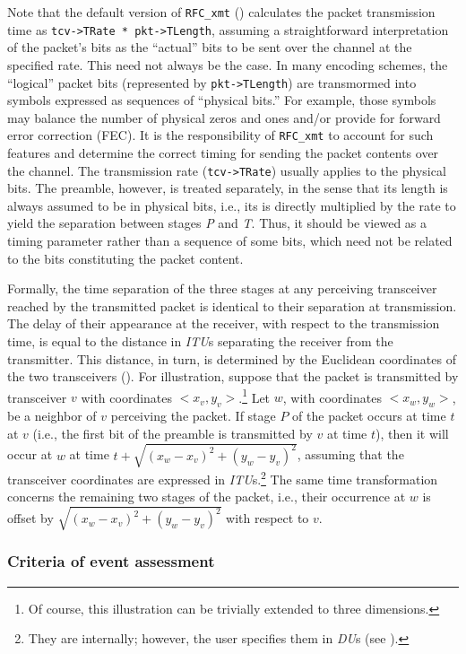 Note that the default version of {\tt RFC\_xmt} ()
calculates the packet transmission time as {\tt tcv->TRate * pkt->TLength},
assuming a straightforward interpretation of the packet's bits as the
``actual'' bits to be sent over the channel at the specified rate.
This need not always be the case.
In many encoding schemes, the ``logical''
packet bits (represented by {\tt pkt->TLength})
are transmormed into symbols expressed as sequences of ``physical bits.''
For example, those symbols may balance the number of physical zeros and ones
and/or provide for forward error correction (FEC).
It is the responsibility of {\tt RFC\_xmt} to account for such features and
determine the correct timing for sending the packet contents over the channel.
The transmission rate ({\tt tcv->TRate}) usually applies to the physical
bits.
The preamble, however, is treated separately, in the sense that its length
is always
assumed to be in physical bits, i.e., its is directly multiplied by the
rate to yield the separation between stages {\em P\/} and {\em T}.
Thus, it should be viewed as a timing parameter rather than a sequence of
some bits, which need not be related to the bits constituting the packet
content.

Formally, the time separation of the three stages at any perceiving
transceiver reached by
the transmitted packet is identical to their separation at transmission.
The delay of their appearance at the receiver, with respect to the transmission
time, is equal to the distance in {\em ITU\/}s separating the
receiver from the transmitter.
This distance, in turn, is determined by the Euclidean coordinates of the
two transceivers ().
For illustration, suppose that the packet is transmitted by transceiver
$v$ with coordinates $<x_v, y_v>$.\footnote{Of course, this illustration
can be trivially extended to three dimensions.}
Let $w$, with coordinates $<x_w, y_w>$, be a neighbor of $v$ perceiving the
packet.
If stage $P$ of the packet occurs at time $t$ at $v$ (i.e., the first bit
of the preamble is transmitted by $v$ at time $t$), then it will occur at
$w$ at time $t+\sqrt{(x_w - x_v)^2 + (y_w - y_v)^2}$, assuming that the
transceiver coordinates are expressed in {\em ITU\/}s.\footnote{They are
internally; however, the user specifies them in {\em DU\/}s
(see ).}
The same time transformation concerns the remaining two stages of the packet,
i.e., their occurrence at $w$ is offset by 
$\sqrt{(x_w - x_v)^2 + (y_w - y_v)^2}$ with respect to $v$.

\subsubsection{Criteria of event assessment}
\label{rm_tr_ra_ca}

